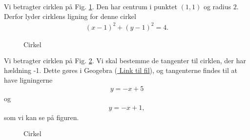 \documentclass[12pt]{article}
\begin{document}
\begin{exa}
Vi betragter cirklen på Fig. \ref{fig:cirkel}. Den har centrum i punktet $(1,1)$ og radius $2$. Derfor lyder cirklens ligning for denne cirkel
\begin{align*}
(x-1)^2 + (y-1)^2 = 4.
\end{align*}
\begin{figure}[H]
\centering
{}
\caption{Cirkel}
\label{fig:cirkel}
\end{figure}
\end{exa}

\begin{exa}
Vi betragter cirklen på Fig. \ref{fig:cirkel2}. Vi skal bestemme de tangenter til cirklen, der har hældning -1. Dette gøres i Geogebra (\href{yada}{\color{blue!60} Link til fil}), og tangenterne findes til at have ligningerne 
\begin{align*}
y = -x+5 
\end{align*}
og
\begin{align*}
y = -x +1, 
\end{align*}
som vi kan se på figuren.
\begin{figure}[H]
\centering
{}
\caption{Cirkel}
\label{fig:cirkel2}
\end{figure}
\end{exa}
\end{document}
